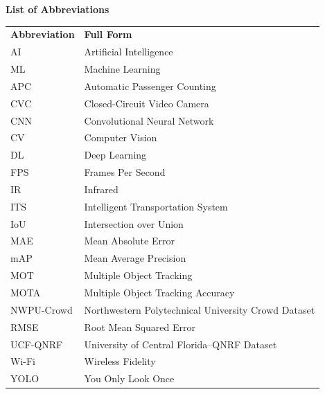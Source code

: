 
\begin{center}
	{\Large\bfseries List of Abbreviations}
\end{center}

\begin{longtable}{p{} p{}}
	\textbf{Abbreviation} & \textbf{Full Form} \\[0.3cm]
	
	AI          & Artificial Intelligence \\
	ML          & Machine Learning \\
	APC         & Automatic Passenger Counting \\
	CVC         & Closed-Circuit Video Camera \\
	CNN         & Convolutional Neural Network \\
	CV          & Computer Vision \\
	DL          & Deep Learning \\
	FPS         & Frames Per Second \\
	IR          & Infrared \\
	ITS         & Intelligent Transportation System \\
	IoU         & Intersection over Union \\
	MAE         & Mean Absolute Error \\
	mAP         & Mean Average Precision \\
	MOT         & Multiple Object Tracking \\
	MOTA        & Multiple Object Tracking Accuracy \\
	NWPU-Crowd  & Northwestern Polytechnical University Crowd Dataset \\
	RMSE        & Root Mean Squared Error \\
	UCF-QNRF    & University of Central Florida--QNRF Dataset \\
	Wi-Fi       & Wireless Fidelity \\
	YOLO        & You Only Look Once \\

\end{longtable}

\clearpage
